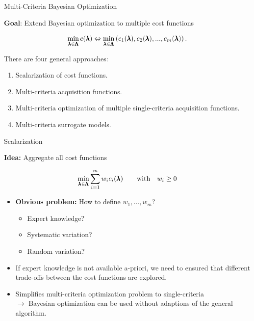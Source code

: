 \begin{frame}{Multi-Criteria Bayesian Optimization}

\textbf{Goal}: Extend Bayesian optimization to multiple cost functions

$$
\min_{\pmb{\lambda} \in \pmb{\Lambda}}  c(\pmb{\lambda}) \Leftrightarrow \min_{\pmb{\lambda} \in \pmb{\Lambda}} \left(c_1(\pmb{\lambda}), c_2(\pmb{\lambda}), ..., c_m(\pmb{\lambda})\right).
$$



There are four general approaches:

\begin{enumerate}
        \item Scalarization of cost functions.
        \item Multi-criteria acquisition functions.
        \item Multi-criteria optimization of multiple single-criteria acquisition functions.
        \item Multi-criteria surrogate models.
\end{enumerate}

\end{frame}

\begin{frame}{Scalarization}

    \textbf{Idea:} Aggregate all cost functions


    $$\min_{\pmb{\lambda} \in \pmb{\Lambda}} \sum_{i = 1}^m w_i c_i(\pmb{\lambda}) \qquad \text{with} \quad w_i \ge 0 $$

    \begin{itemize}
        \item \textbf{Obvious problem:} How to define $w_1, \dots, w_m$?
            \begin{itemize}
                \item Expert knowledge?
                \item Systematic variation?
                \item Random variation?
            \end{itemize}
        \item If expert knowledge is not available a-priori, we need to ensured that different trade-offs between the cost functions are explored.
            \item Simplifies multi-criteria optimization problem to single-criteria \\$\longrightarrow$ Bayesian optimization can be used without adaptions of the general algorithm.
    \end{itemize}

\end{frame}

